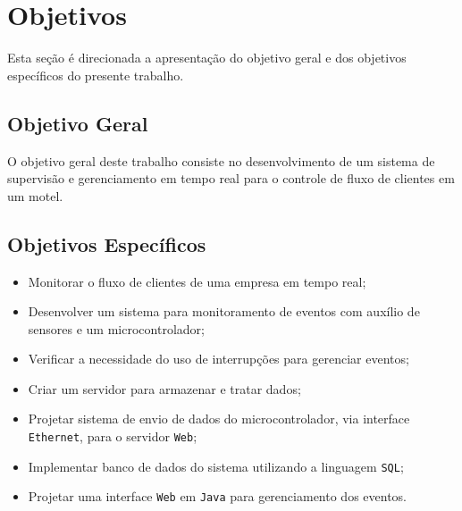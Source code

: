 \chapter[Objetivos]{Objetivos}

Esta seção é direcionada a apresentação do objetivo geral e dos objetivos específicos do
presente trabalho.

\section{Objetivo Geral}

O objetivo geral deste trabalho consiste no desenvolvimento de um sistema de
supervisão e gerenciamento em tempo real para o controle de fluxo de clientes em um motel.

\section{Objetivos Específicos}

\begin{itemize}

	\item Monitorar o fluxo de clientes de uma empresa em tempo real; 
	\item Desenvolver um sistema para monitoramento de eventos com auxílio de sensores e um microcontrolador;
	\item Verificar a necessidade do uso de interrupções para gerenciar eventos;
	\item  Criar um servidor para armazenar e tratar dados;
	\item  Projetar sistema de envio de dados do microcontrolador, via interface \texttt{Ethernet}, para o
		servidor \texttt{Web};
	\item  Implementar banco de dados do sistema utilizando a linguagem \texttt{SQL};
	\item  Projetar uma interface \texttt{Web} em \texttt{Java} para gerenciamento dos eventos.

\end{itemize}



